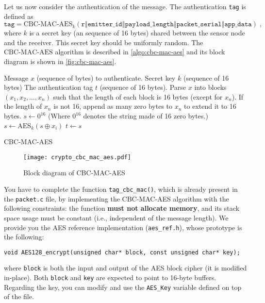 Let us now consider the authentication of the message. The authentication
\texttt{tag} is defined as
\[
    \texttt{tag} = \text{CBC-MAC-AES}_{k}\left(
        \texttt{r$\mathbin\Vert$emitter\_id$\mathbin\Vert$payload\_length$\mathbin\Vert$packet\_serial$\mathbin\Vert$app\_data}
    \right)\;,
\]
where $k$ is a secret key (an sequence of 16 bytes) shared between the sensor
node and the receiver. This secret key should be uniformly random. The $\text{CBC-MAC-AES}$ algorithm is described in \autoref{algo:cbc-mac-aes} and its block diagram is shown in \autoref{fig:cbc-mac-aes}.
\begin{algorithm}
\begin{algorithmic}
    \REQUIRE Message $x$ (sequence of bytes) to authenticate.
    \REQUIRE Secret key $k$ (sequence of 16 bytes)
    \ENSURE The authentication tag $t$ (sequence of 16 bytes).
    \STATE Parse $x$ into blocks $\left(x_1,x_2,\dots,x_n\right)$ such that the
    length of each block is 16 bytes (except for $x_n$).
    \STATE If the length of $x_n$ is not 16, append as many zero bytes to $x_n$
    to extend it to 16 bytes.
    \STATE $s \leftarrow 0^{16}$ (Where $0^{16}$ denotes the string made of 16 zero bytes.)
    \STATE $s \leftarrow \text{AES}_k(s \oplus x_i)$
    \ENDFOR
    \STATE $t \leftarrow s$
\end{algorithmic}
\caption{CBC-MAC-AES}
\label{algo:cbc-mac-aes}
\end{algorithm}

\begin{figure}[h]
\centering
\texttt{[image: crypto\_cbc\_mac\_aes.pdf]}
\caption{Block diagram of CBC-MAC-AES}
\label{fig:cbc-mac-aes}
\end{figure}

You have to complete the function \texttt{tag\_cbc\_mac()}, which is already present in the \texttt{packet.c} file, by implementing the CBC-MAC-AES algorithm with the following constraints: the function \textbf{must not allocate memory}, and its stack space usage must be constant (i.e., independent of the message length).
We provide you the AES reference implementation (\texttt{aes\_ref.h}), whose
prototype is the following:
\begin{lstlisting}[style=customc]
void AES128_encrypt(unsigned char* block, const unsigned char* key);
\end{lstlisting}
where \texttt{block} is both the input and output of the AES block cipher (it
is modified in-place).
Both \texttt{block} and \texttt{key} are expected to point to 16-byte buffers. Regarding the key, you can modify and use the \texttt{AES\_Key} variable defined on top of the file.

